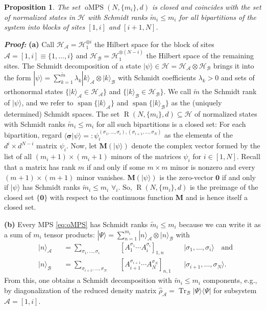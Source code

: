 \documentclass[english,11pt,aps,pra,onecolumn,tightenlines,groupedaddress,superscriptaddress,notitlepage,floatfix,fleqn]{revtex4-1}
\newcommand{\bra}{\langle}
\newcommand{\ket}{\rangle}
\newcommand{\Tr}{\operatorname{Tr}}
\newcommand{\Span}{\operatorname{span}}
\renewcommand{\vec}[1]{{\boldsymbol{#1}}}
\newcommand{\dm}{{\hat{\rho}}}
\newcommand{\s}{\sigma}
\newcommand{\vs}{\vec{\sigma}}
\newcommand{\mc}[1]{\mathcal{#1}}
\renewcommand{\H}{\mc{H}}
\newcommand{\A}{\mc{A}}
\newcommand{\B}{\mc{B}}
\newcommand{\oMPS}{\operatorname{oMPS}}
\newcommand{\R}{\operatorname{R}}
\newcommand{\Emph}[1]{\textbf{\emph{#1}}}
\newtheorem{prop}{Proposition}
\begin{document}
\begin{prop}\label{prop:oMPS}
The set $\oMPS(N,\{m_i\},d)$ is closed and coincides with the set of normalized states in $\H$ with Schmidt ranks $\tilde{m}_i\leq m_i$ for all bipartitions of the system into blocks of sites $[1,i]$ and $[i+1,N]$.
\end{prop}
\Emph{Proof:}
\textbf{(a)} Call $\H_\A=\H_1^{\otimes i}$ the Hilbert space for the block of sites $\A=[1,i]\equiv\{1,\dotsc,i\}$ and $\H_\B=\H_1^{\otimes (N-i)}$ the Hilbert space of the remaining sites. The Schmidt decomposition \cite{Nielsen2000} of a state $|\psi\ket\in\H=\H_\A\otimes\H_\B$ brings it into the form $|\psi\ket=\sum_{k=1}^{\tilde{m}}\lambda_k |k\ket_\A\otimes|k\ket_\B$ with Schmidt coefficients $\lambda_k>0$ and sets of orthonormal states $\{|k\ket_\A\in\H_\A\}$ and $\{|k\ket_\B\in\H_\B\}$. We call $\tilde{m}$ the Schmidt rank of $|\psi\ket$, and we refer to $\Span\{|k\ket_\A\}$ and $\Span\{|k\ket_\B\}$ as the (uniquely determined) Schmidt spaces.
The set $\R(N,\{m_i\},d)\subseteq\H$ of normalized states with Schmidt ranks $\tilde{m}_i\leq m_i$ for all such bipartitions is a closed set: For each bipartition, regard $\bra\vs|\psi\ket=:\psi_i^{(\s_1,\dotsc,\s_i),(\s_{i+1},\dotsc,\s_N)}$ as the elements of the $d^i\times d^{N-i}$ matrix $\psi_i$. Now, let $\vec{M}(|\psi\ket)$ denote the complex vector formed by the list of all $(m_i+1)\times (m_i+1)$ minors of the matrices $\psi_i$ for $i\in[1,N]$. Recall that a matrix has rank $m$ if and only if some $m\times m$ minor is nonzero and every $(m+1)\times(m+1)$ minor vanishes. $\vec{M}(|\psi\ket)$ is the zero-vector $\vec{0}$ if and only if $|\psi\ket$ has Schmidt ranks $\tilde{m}_i\leq m_i$ $\forall_i$. So, $\R(N,\{m_i\},d)$ is the preimage of the closed set $\{\vec{0}\}$ with respect to the continuous function $\vec{M}$ and is hence itself a closed set.

\textbf{(b)} Every MPS \eqref{eq:oMPS} has Schmidt ranks $\tilde{m}_i\leq m_i$ because we can write it as a sum of $m_i$ tensor products: $|\Psi\ket=\sum_{n=1}^{m_i}|n\ket_\A\otimes |n\ket_\B$ with
\begin{subequations}\label{eq:oMPSsplit}
\begin{alignat}{5}
	&|n\ket_\A&&=\textstyle\sum_{\s_1,\dotsc,\s_i}     &&[A_{1}^{\s_{1}}    \dotsb A_{i}^{\s_i}]_{1,n}\,&&|\s_{1},  \dotsc,\s_i\ket\quad\text{and}\\\label{eq:oMPS_nB}
	&|n\ket_\B&&=\textstyle\sum_{\s_{i+1},\dotsc,\s_N} &&[A_{i+1}^{\s_{i+1}}\dotsb A_N^{\s_N}  ]_{n,1}\,&&|\s_{i+1},\dotsc,\s_N\ket.
\end{alignat}
\end{subequations}
From this, one obtains a Schmidt decomposition with $\tilde{m}_i\leq m_i$ components, e.g., by diagonalization of the reduced density matrix $\dm_\A=\Tr_\B|\Psi\ket\bra\Psi|$ for subsystem $\A=[1,i]$.
\end{document}
